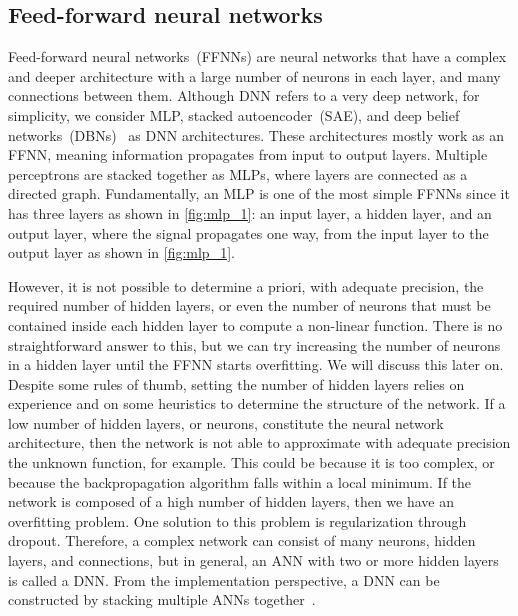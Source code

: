 \subsection{Feed-forward neural networks}
Feed-forward neural networks~(FFNNs) are neural networks that have a complex and deeper architecture with a large number of neurons in each layer, and many connections between them. Although DNN refers to a very deep network, for simplicity, we consider MLP, stacked autoencoder~(SAE), and deep belief networks~(DBNs)~\cite{Hinton:2009} as DNN architectures. These architectures mostly work as an FFNN, meaning information propagates from input to output layers. Multiple perceptrons are stacked together as MLPs, where layers are connected as a directed graph. Fundamentally, an MLP is one of the most simple FFNNs since it has three layers as shown in \cref{fig:mlp_1}: an input layer, a hidden layer, and an output layer, where the signal propagates one way, from the input layer to the output layer as shown in \cref{fig:mlp_1}.

\hspace*{3.5mm} However, it is not possible to determine a priori, with adequate precision, the required number of hidden layers, or even the number of neurons that must be contained inside each hidden layer to compute a non-linear function. There is no straightforward answer to this, but we can try increasing the number of neurons in a hidden layer until the FFNN starts overfitting. We will discuss this later on. Despite some rules of thumb, setting the number of hidden layers relies on experience and on some heuristics to determine the structure of the network. If a low number of hidden layers, or neurons, constitute the neural network architecture, then the network is not able to approximate with adequate precision the unknown function, for example. This could be because it is too complex, or because the backpropagation algorithm falls within a local minimum. If the network is composed of a high number of hidden layers, then we have an overfitting problem. One solution to this problem is regularization through dropout. Therefore, a complex network can consist of many neurons, hidden layers, and connections, but in general, an ANN with two or more hidden layers is called a DNN. From the implementation perspective, a DNN can be constructed by stacking multiple ANNs together~\cite{karimDLTF2018}.

